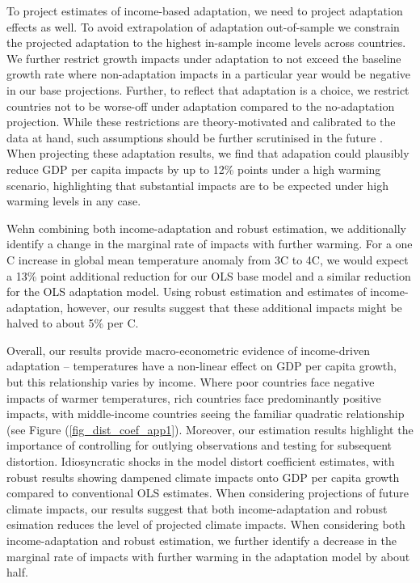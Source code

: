 \documentclass[11pt, letterpaper]{article}
\numberwithin{algorithm}{section}
\numberwithin{assumption}{section}
\numberwithin{lemma}{section}
\numberwithin{theorem}{section}
\numberwithin{corollary}{section}
\numberwithin{remark}{section}
\numberwithin{equation}{section}
\numberwithin{figure}{section}
\numberwithin{table}{section}
\begin{document}
To project estimates of income-based adaptation, we need to project adaptation effects as well. To avoid extrapolation of adaptation out-of-sample we constrain the projected adaptation to the highest in-sample income levels across countries. We further restrict growth impacts under adaptation to not exceed the baseline growth rate where non-adaptation impacts in a particular year would  be negative in our base projections. Further, to reflect that adaptation is a choice, we restrict countries not to be worse-off under adaptation compared to the no-adaptation projection. While these restrictions are theory-motivated and calibrated to the data at hand, such assumptions should be further scrutinised in the future \citet[see ][]{schwarz2020modelling}. When projecting these adaptation results, we find that adapation could plausibly reduce GDP per capita impacts by up to 12\% points under a high warming scenario, highlighting that substantial impacts are to be expected under high warming levels in any case.

Wehn combining both income-adaptation and robust estimation, we additionally identify a change in the marginal rate of impacts with further warming. For a one \textdegree C increase in global mean temperature anomaly from 3\textdegree C to 4\textdegree C, we would expect a 13\% point additional reduction for our OLS base model and a similar reduction for the OLS adaptation model. Using robust estimation and estimates of income-adaptation, however, our results suggest that these additional impacts might be halved to about 5\% per \textdegree C.

Overall, our results provide macro-econometric evidence of income-driven adaptation -- temperatures have a non-linear effect on GDP per capita growth, but this relationship varies by income. Where poor countries face negative impacts of warmer temperatures, rich countries face predominantly positive impacts, with middle-income countries seeing the familiar quadratic relationship (see Figure (\ref{fig_dist_coef_app1}). Moreover, our estimation results highlight the importance of controlling for outlying observations and testing for subsequent distortion. Idiosyncratic shocks in the model distort coefficient estimates, with robust results showing dampened climate impacts onto GDP per capita growth compared to conventional OLS estimates. When considering projections of future climate impacts, our results suggest that both income-adaptation and robust esimation reduces the level of projected climate impacts. When considering both income-adaptation and robust estimation, we further identify a decrease in the marginal rate of impacts with further warming in the adaptation model by about half.
\end{document}
